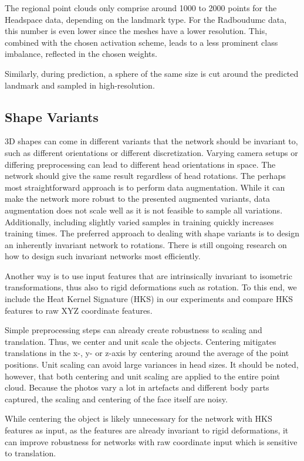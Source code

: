 \documentclass[class=article, crop=false]{standalone}
\begin{document}
The regional point clouds only comprise around 1000 to 2000 points for the Headspace data, depending on the landmark type. For the Radboudumc data, this number is even lower since the meshes have a lower resolution. This, combined with the chosen activation scheme, leads to a less prominent class imbalance, reflected in the chosen weights.

Similarly, during prediction, a sphere of the same size is cut around the predicted landmark and sampled in high-resolution.


\subsection{Shape Variants}
3D shapes can come in different variants that the network should be invariant to, such as different orientations or different discretization. Varying camera setups or differing preprocessing can lead to different head orientations in space. The network should give the same result regardless of head rotations. The perhaps most straightforward approach is to perform data augmentation. While it can make the network more robust to the presented augmented variants, data augmentation does not scale well as it is not feasible to sample all variations. Additionally, including slightly varied samples in training quickly increases training times. The preferred approach to dealing with shape variants is to design an inherently invariant network to rotations. There is still ongoing research on how to design such invariant networks most efficiently. 

Another way is to use input features that are intrinsically invariant to isometric transformations, thus also to rigid deformations such as rotation. To this end, we include the Heat Kernel Signature (HKS) in our experiments and compare HKS features to raw XYZ coordinate features.

Simple preprocessing steps can already create robustness to scaling and translation. Thus, we center and unit scale the objects. Centering mitigates translations in the x-, y- or z-axis by centering around the average of the point positions. Unit scaling can avoid large variances in head sizes. It should be noted, however, that both centering and unit scaling are applied to the entire point cloud. Because the photos vary a lot in artefacts and different body parts captured, the scaling and centering of the face itself are noisy.

While centering the object is likely unnecessary for the network with HKS features as input, as the features are already invariant to rigid deformations, it can improve robustness for networks with raw coordinate input which is sensitive to translation.
\end{document}
